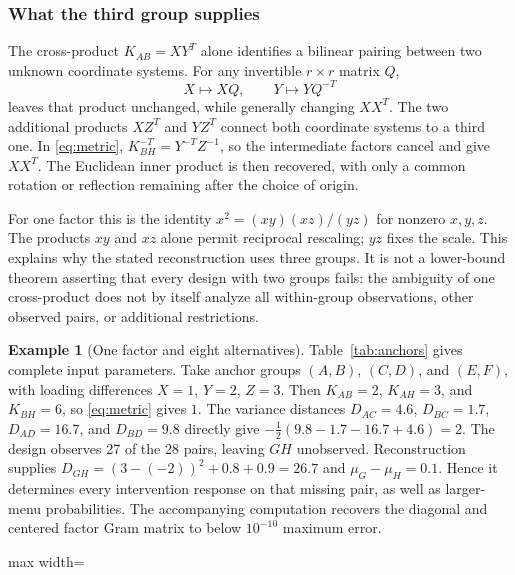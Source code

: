 \documentclass[11pt]{amsart}
\theoremstyle{definition}
\newtheorem{example}[theorem]{Example}
\begin{document}
\subsubsection{What the third group supplies}
The cross-product $K_{AB}=XY^T$ alone identifies a bilinear pairing between
two unknown coordinate systems. For any invertible $r\times r$ matrix $Q$,
\[
 X\longmapsto XQ,\qquad Y\longmapsto YQ^{-T}
\]
leaves that product unchanged, while generally changing $XX^T$. The two
additional products $XZ^T$ and $YZ^T$ connect both coordinate systems to
a third one. In \eqref{eq:metric},
$K_{BH}^{-T}=Y^{-T}Z^{-1}$, so the intermediate factors cancel and give
$XX^T$. The Euclidean inner product is then recovered, with only a common
rotation or reflection remaining after the choice of origin.

For one factor this is the identity $x^2=(xy)(xz)/(yz)$ for nonzero $x,y,z$.
The products $xy$ and $xz$ alone permit reciprocal rescaling; $yz$ fixes
the scale. This explains why the stated reconstruction uses three groups.
It is not a lower-bound theorem asserting that every design with two groups
fails: the ambiguity of one cross-product does not by itself analyze all
within-group observations, other observed pairs, or additional restrictions.

\begin{example}[One factor and eight alternatives]
Table~\ref{tab:anchors} gives complete input parameters. Take anchor groups $(A,B)$, $(C,D)$, and $(E,F)$, with loading differences $X=1$, $Y=2$, $Z=3$. Then $K_{AB}=2$, $K_{AH}=3$, and $K_{BH}=6$, so \eqref{eq:metric} gives $1$. The variance distances $D_{AC}=4.6$, $D_{BC}=1.7$, $D_{AD}=16.7$, and $D_{BD}=9.8$ directly give
$-\tfrac12(9.8-1.7-16.7+4.6)=2$.
The design observes 27 of the 28 pairs, leaving $GH$ unobserved. Reconstruction supplies
$D_{GH}=(3-(-2))^2+0.8+0.9=26.7$ and $\mu_G-\mu_H=0.1$. Hence it determines every intervention response on that missing pair, as well as larger-menu probabilities. The accompanying computation recovers the diagonal and centered factor Gram matrix to below $10^{-10}$ maximum error.
\end{example}

\begin{table}[ht]
\centering
\caption{Input data for the eight-alternative reconstruction example. The first six alternatives form the three anchor groups.}\label{tab:anchors}
\begin{adjustbox}{max width=\textwidth}\end{adjustbox}
\end{table}
\end{document}
